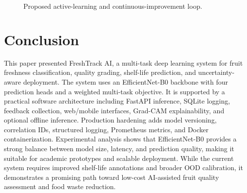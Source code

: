\documentclass[conference]{IEEEtran}
\begin{document}
\begin{figure}[t]
\centering
{}
\caption{Proposed active-learning and continuous-improvement loop.}
\label{fig:active_learning}
\end{figure}

\section{Conclusion}
This paper presented FreshTrack AI, a multi-task deep learning system for fruit freshness classification, quality grading, shelf-life prediction, and uncertainty-aware deployment. The system uses an EfficientNet-B0 backbone with four prediction heads and a weighted multi-task objective. It is supported by a practical software architecture including FastAPI inference, SQLite logging, feedback collection, web/mobile interfaces, Grad-CAM explainability, and optional offline inference. Production hardening adds model versioning, correlation IDs, structured logging, Prometheus metrics, and Docker containerization. Experimental analysis shows that EfficientNet-B0 provides a strong balance between model size, latency, and prediction quality, making it suitable for academic prototypes and scalable deployment. While the current system requires improved shelf-life annotations and broader OOD calibration, it demonstrates a promising path toward low-cost AI-assisted fruit quality assessment and food waste reduction.
\end{document}
